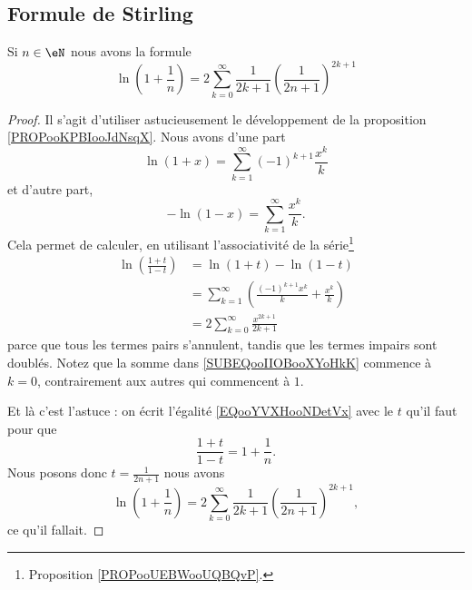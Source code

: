 \subsection{Formule de Stirling}

\begin{lemma}     \label{LEMooDXJOooOGFcIv}
	Si \( n\in \eN\) nous avons la formule
	\begin{equation}
		\ln(1+\frac{1}{ n })=2\sum_{k=0}^{\infty} \frac{1}{ 2k+1 } \left( \frac{1}{ 2n+1 } \right)^{2k+1}
	\end{equation}
\end{lemma}

\begin{proof}
	Il s'agit d'utiliser astucieusement le développement de la proposition \ref{PROPooKPBIooJdNsqX}. Nous avons d'une part
	\begin{equation}
		\ln(1+x)=\sum_{k=1}^{\infty}(-1)^{k+1}\frac{ x^k }{ k }
	\end{equation}
	et d'autre part,
	\begin{equation}
		-\ln(1-x)=\sum_{k=1}^{\infty}\frac{ x^k }{ k }.
	\end{equation}
	Cela permet de calculer, en utilisant l'associativité de la série\footnote{Proposition \ref{PROPooUEBWooUQBQvP}.}
	\begin{subequations}\label{EQooYVXHooNDetVx}
		\begin{align}
			\ln\left( \frac{ 1+t }{ 1-t } \right) & =\ln(1+t)-\ln(1-t)                                                               \\
			                                      & =\sum_{k=1}^{\infty}\left( \frac{ (-1)^{k+1}x^k }{ k }+\frac{ x^k }{ k } \right) \\
			                                      & =2\sum_{k=0}^{\infty}\frac{ x^{2k+1} }{ 2k+1 }     \label{SUBEQooIIOBooXYoHkK}
		\end{align}
	\end{subequations}
	parce que tous les termes pairs s'annulent, tandis que les termes impairs sont doublés. Notez que la somme dans \eqref{SUBEQooIIOBooXYoHkK} commence à \( k=0\), contrairement aux autres qui commencent à \( 1\).

	Et là c'est l'astuce : on écrit l'égalité \eqref{EQooYVXHooNDetVx} avec le \( t\) qu'il faut pour que
	\begin{equation}
		\frac{ 1+t }{ 1-t }=1+\frac{1}{ n }.
	\end{equation}
	Nous posons donc \( t=\frac{1}{ 2n+1 }\) nous avons
	\begin{equation}
		\ln\left( 1+\frac{1}{ n } \right)=2\sum_{k=0}^{\infty}  \frac{1}{ 2k+1 } \left( \frac{1}{ 2n+1 } \right)^{2k+1},
	\end{equation}
	ce qu'il fallait.
\end{proof}


